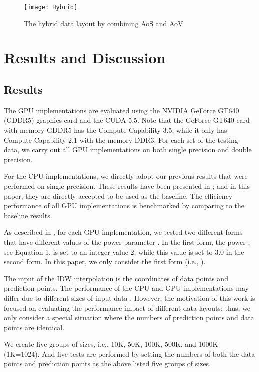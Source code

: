 \begin{figure}[htb]
\centering
    \texttt{[image: Hybrid]}
    \caption{The hybrid data layout by combining AoS and AoV}
    \label{fig:layout:hybrid}       \end{figure}


\section{Results and Discussion}
\label{sec:result:and:discuss}


\subsection{Results}
\label{sec:result}

The GPU implementations are evaluated using the NVIDIA GeForce GT640 (GDDR5) 
graphics card and the CUDA 5.5. Note that the GeForce GT640 card with 
memory GDDR5 has the Compute Capability 3.5, while it only has Compute 
Capability 2.1 with the memory DDR3. For each set of the testing data, we 
carry out all GPU implementations on both single precision and double 
precision. 

For the CPU implementations, we directly adopt our previous results that 
were performed on single precision. These results have been presented in \cite{mei2014}; and in this paper, they are directly accepted to be used as the 
baseline. The efficiency performance of all GPU implementations is 
benchmarked by comparing to the baseline results.

As described in \cite{mei2014}, for each GPU implementation, we tested two 
different forms that have different values of the power parameter . In the 
first form, the power , see Equation 1, is set to an integer value 2, while 
this value is set to 3.0 in the second form. In this paper, we only consider 
the first form (i.e., ).

The input of the IDW interpolation is the coordinates of data points and 
prediction points. The performance of the CPU and GPU implementations may 
differ due to different sizes of input data \cite{hanzer2012,hennebohl2011}. However, the 
motivation of this work is focused on evaluating the performance impact of 
different data layouts; thus, we only consider a special situation where the 
numbers of prediction points and data points are identical.

We create five groups of sizes, i.e., 10K, 50K, 100K, 500K, and 1000K 
(1K=1024). And five tests are performed by setting the numbers of both the 
data points and prediction points as the above listed five groups of sizes. 


